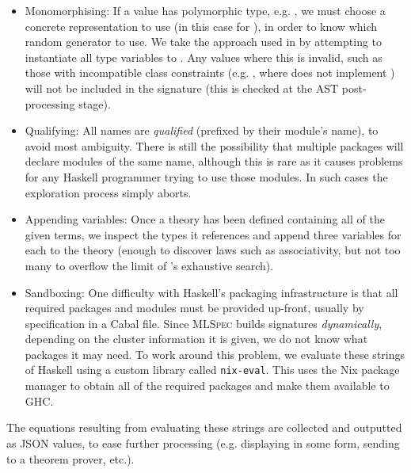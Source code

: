 \begin{itemize}
  \item{Monomorphising}: If a value has polymorphic type, e.g. , we must choose a concrete representation to use (in this case for ), in order to know which random generator to use. We take the approach used in \qcheck{} by attempting to instantiate all type variables to . Any values where this is invalid, such as those with incompatible class constraints (e.g. , where  does not implement ) will not be included in the signature (this is checked at the AST post-processing stage).

  \item{Qualifying}: All names are \emph{qualified} (prefixed by their module's name), to avoid most ambiguity. There is still the possibility that multiple packages will declare modules of the same name, although this is rare as it causes problems for any Haskell programmer trying to use those modules. In such cases the exploration process simply aborts.

  \item{Appending variables}: Once a \qspec{} theory has been defined containing all of the given terms, we inspect the types it references and append three variables for each to the theory (enough to discover laws such as associativity, but not too many to overflow the limit of \qspec{}'s exhaustive search).

  \item{Sandboxing}: One difficulty with Haskell's packaging infrastructure is that all required packages and modules must be provided up-front, usually by specification in a Cabal file. Since \textsc{MLSpec} builds signatures \emph{dynamically}, depending on the cluster information it is given, we do not know what packages it may need. To work around this problem, we evaluate these strings of Haskell using a custom library called \texttt{nix-eval}. This uses the Nix package manager to obtain all of the required packages and make them available to GHC.

\end{itemize}

The equations resulting from evaluating these strings are collected and outputted as JSON values, to ease further processing (e.g. displaying in some form, sending to a theorem prover, etc.).
